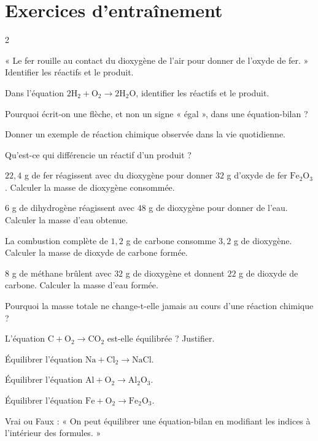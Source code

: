 \section{Exercices d'entraînement}
\begin{multicols}{2}

\exo{} « Le fer rouille au contact du dioxygène de l'air pour donner de l'oxyde de
fer. » Identifier les réactifs et le produit.

\exo{} Dans l'équation $2\mathrm{H_2}+\mathrm{O_2}\to2\mathrm{H_2O}$, identifier
les réactifs et le produit.

\exo{} Pourquoi écrit-on une flèche, et non un signe « égal », dans une
équation-bilan ?

\exo{} Donner un exemple de réaction chimique observée dans la vie quotidienne.

\exo{} Qu'est-ce qui différencie un réactif d'un produit ?

\exo{} $22{,}4$ g de fer réagissent avec du dioxygène pour donner $32$ g d'oxyde
de fer $\mathrm{Fe_2O_3}$. Calculer la masse de dioxygène consommée.

\exo{} $6$ g de dihydrogène réagissent avec $48$ g de dioxygène pour donner de
l'eau. Calculer la masse d'eau obtenue.

\exo{} La combustion complète de $1{,}2$ g de carbone consomme $3{,}2$ g de
dioxygène. Calculer la masse de dioxyde de carbone formée.

\exo{} $8$ g de méthane brûlent avec $32$ g de dioxygène et donnent $22$ g de
dioxyde de carbone. Calculer la masse d'eau formée.

\exo{} Pourquoi la masse totale ne change-t-elle jamais au cours d'une réaction
chimique ?

\exo{} L'équation $\mathrm{C}+\mathrm{O_2}\to\mathrm{CO_2}$ est-elle équilibrée ?
Justifier.

\exo{} Équilibrer l'équation $\mathrm{Na}+\mathrm{Cl_2}\to\mathrm{NaCl}$.

\exo{} Équilibrer l'équation $\mathrm{Al}+\mathrm{O_2}\to\mathrm{Al_2O_3}$.

\exo{} Équilibrer l'équation $\mathrm{Fe}+\mathrm{O_2}\to\mathrm{Fe_2O_3}$.

\exo{} Vrai ou Faux : « On peut équilibrer une équation-bilan en modifiant les
indices à l'intérieur des formules. »


\end{multicols}

